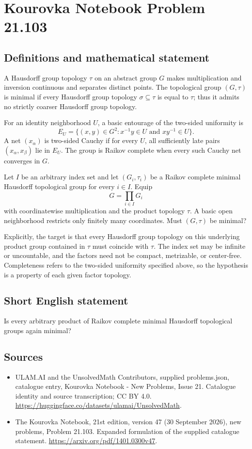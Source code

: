 \documentclass[11pt,a4paper]{article}
\begin{document}
\section*{Kourovka Notebook Problem 21.103}\label{statement}

\subsection{Definitions and mathematical statement}
A Hausdorff group topology $\tau$ on an abstract group $G$ makes multiplication and inversion continuous and separates distinct points. The topological group $(G,\tau)$ is minimal if every Hausdorff group topology $\sigma\subseteq\tau$ is equal to $\tau$; thus it admits no strictly coarser Hausdorff group topology.

For an identity neighborhood $U$, a basic entourage of the two-sided uniformity is
\[
 E_U=\{(x,y)\in G^2:x^{-1}y\in U\text{ and }xy^{-1}\in U\}.
\]
A net $(x_\alpha)$ is two-sided Cauchy if for every $U$, all sufficiently late pairs $(x_\alpha,x_\beta)$ lie in $E_U$. The group is Raikov complete when every such Cauchy net converges in $G$.

Let $I$ be an arbitrary index set and let $(G_i,\tau_i)$ be a Raikov complete minimal Hausdorff topological group for every $i\in I$. Equip
\[
 G=\prod_{i\in I}G_i
\]
with coordinatewise multiplication and the product topology $\tau$. A basic open neighborhood restricts only finitely many coordinates. Must $(G,\tau)$ be minimal?

Explicitly, the target is that every Hausdorff group topology on this underlying product group contained in $\tau$ must coincide with $\tau$. The index set may be infinite or uncountable, and the factors need not be compact, metrizable, or center-free. Completeness refers to the two-sided uniformity specified above, so the hypothesis is a property of each given factor topology.
\subsection{Short English statement}
Is every arbitrary product of Raikov complete minimal Hausdorff topological groups again minimal?
\subsection{Sources}
\begin{itemize}
\item[S1] ULAM.AI and the UnsolvedMath Contributors, supplied problems.json, catalogue entry, Kourovka Notebook - New Problems, Issue 21. Catalogue identity and source transcription; CC BY 4.0.
\url{https://huggingface.co/datasets/ulamai/UnsolvedMath}.
\item[S2] The Kourovka Notebook, 21st edition, version 47 (30 September 2026), new problems, Problem 21.103. Expanded formulation of the supplied catalogue statement.
\url{https://arxiv.org/pdf/1401.0300v47}.
\end{itemize}
\end{document}
